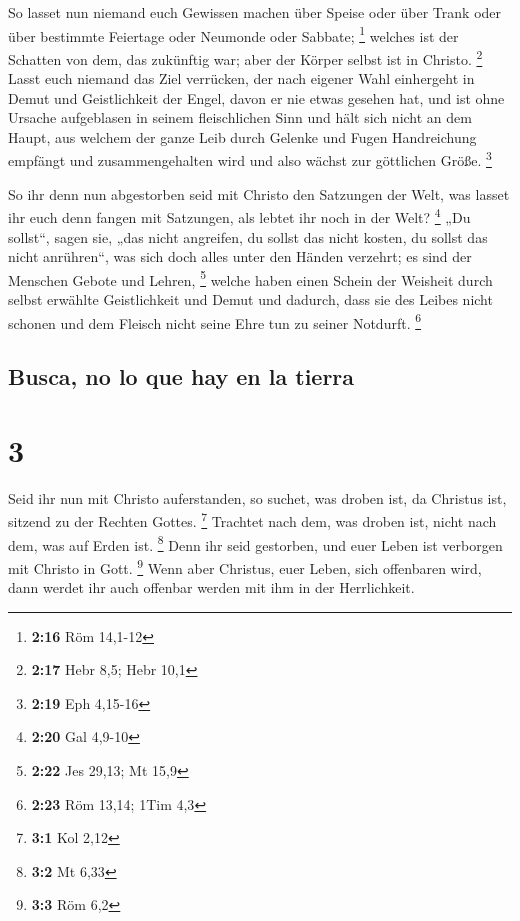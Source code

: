  So lasset nun niemand euch Gewissen machen über Speise
oder über Trank oder über bestimmte Feiertage oder Neumonde oder
Sabbate; \footnote{\textbf{2:16} Röm 14,1-12}  welches
ist der Schatten von dem, das zukünftig war; aber der Körper selbst ist
in Christo. \footnote{\textbf{2:17} Hebr 8,5; Hebr 10,1} 
Lasst euch niemand das Ziel verrücken, der nach eigener Wahl einhergeht
in Demut und Geistlichkeit der Engel, davon er nie etwas gesehen hat,
und ist ohne Ursache aufgeblasen in seinem fleischlichen Sinn
 und hält sich nicht an dem Haupt, aus welchem der ganze
Leib durch Gelenke und Fugen Handreichung empfängt und zusammengehalten
wird und also wächst zur göttlichen Größe. \footnote{\textbf{2:19} Eph
  4,15-16}

 So ihr denn nun abgestorben seid mit Christo den
Satzungen der Welt, was lasset ihr euch denn fangen mit Satzungen, als
lebtet ihr noch in der Welt? \footnote{\textbf{2:20} Gal 4,9-10}
 „Du sollst``, sagen sie, „das nicht angreifen, du sollst
das nicht kosten, du sollst das nicht anrühren``,  was
sich doch alles unter den Händen verzehrt; es sind der Menschen Gebote
und Lehren, \footnote{\textbf{2:22} Jes 29,13; Mt 15,9} 
welche haben einen Schein der Weisheit durch selbst erwählte
Geistlichkeit und Demut und dadurch, dass sie des Leibes nicht schonen
und dem Fleisch nicht seine Ehre tun zu seiner Notdurft. \footnote{\textbf{2:23}
  Röm 13,14; 1Tim 4,3}

\hypertarget{busca-no-lo-que-hay-en-la-tierra}{%
\subsection{Busca, no lo que hay en la
tierra}\label{busca-no-lo-que-hay-en-la-tierra}}

\hypertarget{section-2}{%
\section{3}\label{section-2}}

 Seid ihr nun mit Christo auferstanden, so suchet, was
droben ist, da Christus ist, sitzend zu der Rechten Gottes. \footnote{\textbf{3:1}
  Kol 2,12}  Trachtet nach dem, was droben ist, nicht nach
dem, was auf Erden ist. \footnote{\textbf{3:2} Mt 6,33} 
Denn ihr seid gestorben, und euer Leben ist verborgen mit Christo in
Gott. \footnote{\textbf{3:3} Röm 6,2}  Wenn aber Christus,
euer Leben, sich offenbaren wird, dann werdet ihr auch offenbar werden
mit ihm in der Herrlichkeit.

